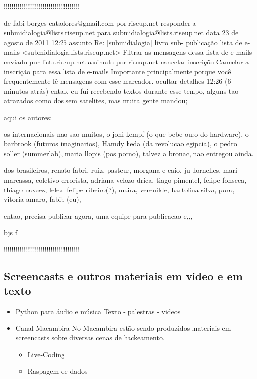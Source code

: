 \begin{itemize}
!!!!!!!!!!!!!!!!!!!!!!!!!!!!!!!!!!!!!!!

de      fabi borges catadores@gmail.com por  riseup.net 
responder a     submidialogia@lists.riseup.net
para    submidialogia@lists.riseup.net
data    23 de agosto de 2011 12:26
assunto Re: [submidialogia] livro sub- publicação
lista de e-mails        <submidialogia.lists.riseup.net> Filtrar as mensagens dessa lista de e-mails
enviado por     lists.riseup.net
assinado por    riseup.net
cancelar inscrição      Cancelar a inscrição para essa lista de e-mails
        Importante principalmente porque você frequentemente lê mensagens com esse marcador.
ocultar detalhes 12:26 (6 minutos atrás)
entao, eu fui recebendo textos durante esse tempo,
alguns tao atrazados como dos sem satelites, mas muita gente mandou;

aqui os autores:

os internacionais nao sao muitos, o joni kempf (o que bebe ouro do hardware), o barbrook (futuros imaginarios),
Hamdy heda (da revolucao egipcia), o pedro soller (summerlab), maria llopis (pos porno),  talvez a bronac, nao entregou ainda.

dos brasileiros, renato fabri, ruiz, pasteur, morgana e caio, ju dornelles, mari marcassa, coletivo errorista, adriana velozo-drica, tiago pimentel, felipe fonseca, thiago novaes, lelex, felipe ribeiro(?), maira, verenilde,  bartolina silva, poro, vitoria amaro, fabib (eu),

entao, precisa publicar agora,
uma equipe para publicacao e,,, 

bjs
f

!!!!!!!!!!!!!!!!!!!!!!!!!!!!!!!!!!!!!!!

\end{itemize}

\subsection{Screencasts e outros materiais em video e em texto}

\begin{itemize}
    \item Python para áudio e música
	  Texto - palestras - videos

    \item Canal Macambira
No Macambira estão sendo produzidos materiais em screencasts sobre
diversas cenas de hackeamento.

    \begin{itemize}
	\item Live-Coding
	\item Raspagem de dados
    \end{itemize}
\end{itemize}

